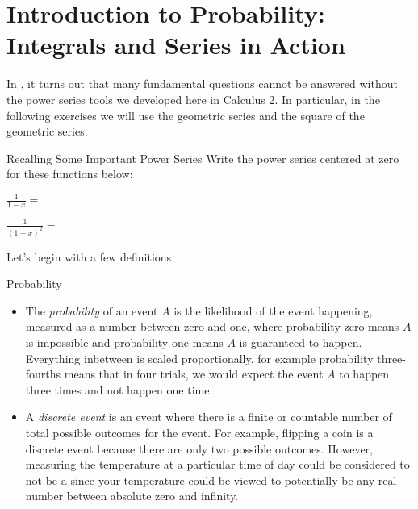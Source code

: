 \chapter{Introduction to Probability: Integrals and Series in Action}

In , it turns out that many fundamental questions cannot be answered without the power series tools we developed here in Calculus 2.  In particular, in the following exercises we will use the geometric series and the square of the geometric series.  

\begin{exercise}{Recalling Some Important Power Series \Coffeecup}
Write the power series centered at zero for these functions below:

\vspace*{.1in}

$ \frac{1}{1-x}=$

\vspace*{.3in}

$ \frac{1}{(1-x)^2}=$

\vspace*{.3in}
\end{exercise}

Let's begin with a few definitions.

\begin{definition}{Probability}
\begin{itemize}
\item The \emph{probability} of an event $A$ is the likelihood of the event happening, measured as a number between zero and one, where probability zero means $A$ is impossible and probability one means $A$ is guaranteed to happen.  Everything inbetween is scaled proportionally, for example probability three-fourths means that in four trials, we would expect the event $A$ to happen three times and not happen one time.
\item A \emph{discrete event} is an event where there is a finite or countable number of total possible outcomes for the event.  For example, flipping a coin is a discrete event because there are only two possible outcomes.  However, measuring the temperature at a particular time of day could be considered to not be a  since your temperature could be viewed to potentially be any real number between absolute zero and infinity. 
\end{itemize}
\end{definition}


